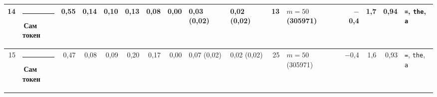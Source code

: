\documentclass[10pt]{article}
\begin{document}
\begin{minipage}{\linewidth}
\begin{center}
{\begin{tabular}{|r|l|r|r|r|r|r|r|l|l|r|l|r|r|r|l|}
14 & \textcolor[HTML]{2A78D6}{\rule{0.62em}{0.62em}}\,\textbf{Сам токен} & 0,55 & 0,14 & 0,10 & 0,13 & 0,08 & 0,00 & 0,03 (0,02) & 0,02 (0,02) & 13 & $m{=}50$ (305971) & $-$0,4 & 1,7 & 0,94 & \texttt{\textvisiblespace{}=}, \texttt{\textvisiblespace{}the}, \texttt{\textvisiblespace{}a} \\ \hline
15 & \textcolor[HTML]{2A78D6}{\rule{0.62em}{0.62em}}\,\textbf{Сам токен} & 0,47 & 0,08 & 0,09 & 0,20 & 0,17 & 0,00 & 0,07 (0,02) & 0,02 (0,02) & 25 & $m{=}50$ (305971) & $-$0,4 & 1,6 & 0,93 & \texttt{\textvisiblespace{}=}, \texttt{\textvisiblespace{}the}, \texttt{\textvisiblespace{}a} \\ \hline
\hline\end{tabular}}\end{center}
\end{minipage}
\par\vspace{0.4em}
\end{document}
